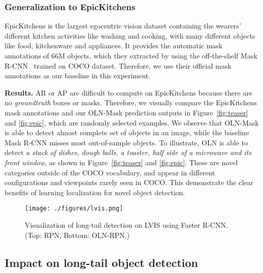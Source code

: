 \documentclass[10pt,twocolumn,letterpaper]{article}
\newcommand{\OURS}{OLN}
\newcommand{\figureref}[1]{Figure~\ref{#1}}
\renewcommand{\paragraph}[1]{\vspace{1mm}\noindent\textbf{#1}}
\begin{document}
\subsubsection{Generalization to EpicKitchens}
EpicKitchens is the largest egocentric vision dataset containing the wearers' different kitchen activities like washing and cooking, with many different objects like food, kitchenware and appliances. It provides the automatic mask annotations of 66M objects, which they extracted by using the off-the-shelf Mask R-CNN~\cite{he2017mask} trained on COCO dataset. Therefore, we use their official mask annotations as our baseline in this experiment.

\paragraph{Results.} \quad 
AR or AP are difficult to compute on EpicKitchens because there are no \textit{groundtruth} boxes or masks. Therefore, we visually compare the EpicKitchens mask annotations and our \OURS{}-Mask prediction outputs in \figureref{fig:teaser} and \ref{fig:epic}, which are randomly selected examples. We observe that \OURS{}-Mask is able to detect almost complete set of objects in an image, while the baseline Mask R-CNN misses most out-of-sample objects. To illustrate, \OURS{} is able to detect \textit{a stack of dishes, dough balls, a toaster, half side of a microwave and its front window}, as shown in \figureref{fig:teaser} and \ref{fig:epic}. These are novel categories outside of the COCO vocabulary, and appear in different configurations and viewpoints rarely seen in COCO. This demonstrate the clear benefits of learning localization for novel object detection.





\begin{figure}
\centering
\texttt{[image: ./figures/lvis.png]}
\caption{{Visualization of long-tail detection on LVIS using Faster R-CNN. (Top: RPN, Bottom: OLN-RPN.)}}
\label{fig:lvis}
\end{figure}


\subsection{Impact on long-tail object detection}
\label{sec:application}
\end{document}
